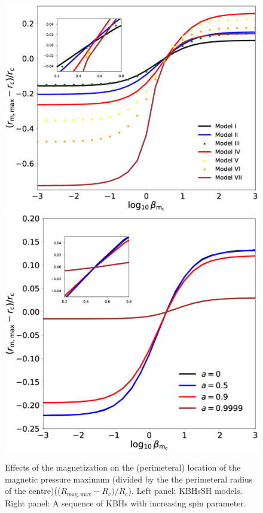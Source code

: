 \documentclass[twocolumn,aps,showpacs,showkeys,prd,superscriptaddress,byrevtex, amsmath]{revtex4-1}
\begin{document}
\begin{figure}
\centering
\includegraphics[scale=0.2]{figures/fig8_HBH.eps}
\hspace{0.5cm}
\includegraphics[scale=0.2]{figures/fig8_Kerr.eps}
\hspace{0.5cm}
\caption{Effects of the magnetization on the (perimeteral) location of the magnetic pressure maximum (divided by the the perimeteral radius of the centre)(($R_{\mathrm{mag}, \mathrm{max}} - R_{\mathrm{c}})/ R_{\mathrm{c}}$). Left panel: KBHsSH models. Right panel: A sequence of KBHs with increasing spin parameter.}
\label{comparison_HBH_Kerr_r_m_max}
\end{figure}
\end{document}
